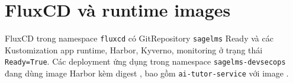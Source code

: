 \section{FluxCD và runtime images}

FluxCD trong namespace \texttt{fluxcd} có GitRepository \texttt{sagelms} Ready và các Kustomization app runtime, Harbor, Kyverno, monitoring ở trạng thái \texttt{Ready=True}. Các deployment ứng dụng trong namespace \texttt{sagelms-devsecops} đang dùng image Harbor kèm digest , bao gồm \texttt{ai-tutor-service} với image .
